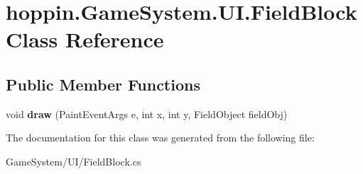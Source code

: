 \hypertarget{classhoppin_1_1_game_system_1_1_u_i_1_1_field_block}{}\section{hoppin.\+Game\+System.\+U\+I.\+Field\+Block Class Reference}
\label{classhoppin_1_1_game_system_1_1_u_i_1_1_field_block}
\subsection*{Public Member Functions}
\begin{DoxyCompactItemize}
\item 
void {\bfseries draw} (Paint\+Event\+Args e, int x, int y, Field\+Object field\+Obj)\hypertarget{classhoppin_1_1_game_system_1_1_u_i_1_1_field_block_ad27446055519097ea39a57f7db929289}{}\label{classhoppin_1_1_game_system_1_1_u_i_1_1_field_block_ad27446055519097ea39a57f7db929289}

\end{DoxyCompactItemize}


The documentation for this class was generated from the following file\+:\begin{DoxyCompactItemize}
\item 
Game\+System/\+U\+I/Field\+Block.\+cs\end{DoxyCompactItemize}
